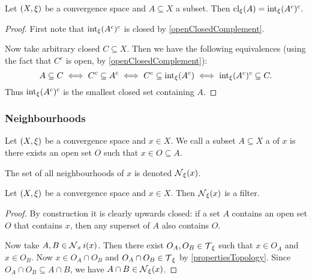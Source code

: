 \begin{lemma} \label{interiorClosureComplement}
Let $\left( X,\xi \right)$ be a convergence space and $A\subseteq X$ a subset. Then $\operatorname{cl}_\xi(A) = \operatorname{int}_\xi(A^c)^c$.
\end{lemma}
\begin{proof}
First note that $\operatorname{int}_\xi(A^c)^c$ is closed by \ref{openClosedComplement}.

Now take arbitrary closed $C\subseteq X$. Then we have the following equivalences (using the fact that $C^c$ is open, by \ref{openClosedComplement}):
\[ A\subseteq C \iff C^c \subseteq A^c \iff C^c \subseteq \operatorname{int}_\xi(A^c) \iff \operatorname{int}_\xi(A^c)^c\subseteq C. \]
Thus $\operatorname{int}_\xi(A^c)^c$ is the smallest closed set containing $A$.
\end{proof}

\subsubsection{Neighbourhoods}
\begin{definition}
Let $\left( X,\xi \right)$ be a convergence space and $x\in X$. We call a subset $A\subseteq X$ a  of $x$ is there exists an open set $O$ such that $x\in O \subseteq A$.

The set of all neighbourhoods of $x$ is denoted $\operatorname{\mathcal{N}}_\xi(x)$.
\end{definition}
\begin{lemma}
Let $\left( X,\xi \right)$ be a convergence space and $x\in X$. Then $\operatorname{\mathcal{N}}_\xi(x)$ is a filter.
\end{lemma}
\begin{proof}
By construction it is clearly upwards closed: if a set $A$ contains an open set $O$ that contains $x$, then any superset of $A$ also contains $O$.

Now take $A,B\in \operatorname{\mathcal{N}}_xi(x)$. Then there exist $O_A, O_B \in \operatorname{\mathcal{T}}_\xi$ such that $x\in O_A$ and $x\in O_B$. Now $x\in O_A\cap O_B$ and $O_A\cap O_B \in \operatorname{\mathcal{T}}_\xi$ by \ref{propertiesTopology}. Since $O_A\cap O_B\subseteq A\cap B$, we have $A\cap B\in \operatorname{\mathcal{N}}_\xi(x)$.
\end{proof}

